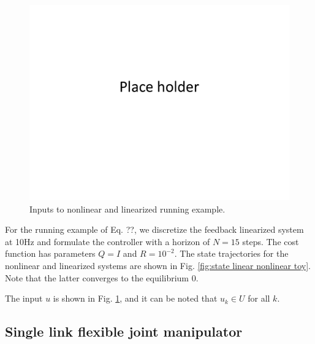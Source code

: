 \begin{figure}
	\centering	
	\includegraphics[scale=0.2]{figs/placeHolder.pdf}
	\caption{Inputs to nonlinear and linearized running example.}
	\label{fig:input toy}
\end{figure}

For the running example of Eq. ??, we discretize the feedback linearized system at 10Hz and formulate the controller with a horizon of $N=15$ steps. 
The cost function has parameters $Q=I$ and $R=10^{-2}$.
The state trajectories for the nonlinear and linearized systems are shown in Fig. \ref{fig:state linear nonlinear toy}.
Note that the latter converges to the equilibrium 0. 

The input $u$ is shown in Fig. \ref{fig:input toy}, and it can be noted that $u_k \in U$ for all $k$.

\subsection{Single link flexible joint manipulator}
\label{sec:manipulator}

